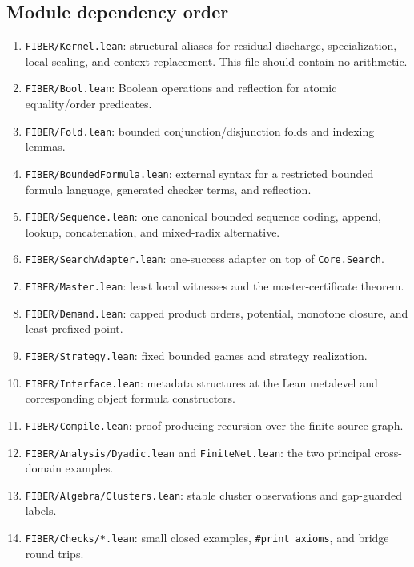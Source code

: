 \subsection{Module dependency order}

\begin{enumerate}
\item \texttt{FIBER/Kernel.lean}: structural aliases for residual discharge,
      specialization, local sealing, and context replacement.  This file
      should contain no arithmetic.
\item \texttt{FIBER/Bool.lean}: Boolean operations and reflection for atomic
      equality/order predicates.
\item \texttt{FIBER/Fold.lean}: bounded conjunction/disjunction folds and
      indexing lemmas.
\item \texttt{FIBER/BoundedFormula.lean}: external syntax for a restricted
      bounded formula language, generated checker terms, and reflection.
\item \texttt{FIBER/Sequence.lean}: one canonical bounded sequence coding,
      append, lookup, concatenation, and mixed-radix alternative.
\item \texttt{FIBER/SearchAdapter.lean}: one-success adapter on top of
      \texttt{Core.Search}.
\item \texttt{FIBER/Master.lean}: least local witnesses and the
      master-certificate theorem.
\item \texttt{FIBER/Demand.lean}: capped product orders, potential, monotone
      closure, and least prefixed point.
\item \texttt{FIBER/Strategy.lean}: fixed bounded games and strategy
      realization.
\item \texttt{FIBER/Interface.lean}: metadata structures at the Lean
      metalevel and corresponding object formula constructors.
\item \texttt{FIBER/Compile.lean}: proof-producing recursion over the finite
      source graph.
\item \texttt{FIBER/Analysis/Dyadic.lean} and
      \texttt{FiniteNet.lean}: the two principal cross-domain examples.
\item \texttt{FIBER/Algebra/Clusters.lean}: stable cluster observations and
      gap-guarded labels.
\item \texttt{FIBER/Checks/*.lean}: small closed examples, \texttt{\#print
      axioms}, and bridge round trips.
\end{enumerate}

